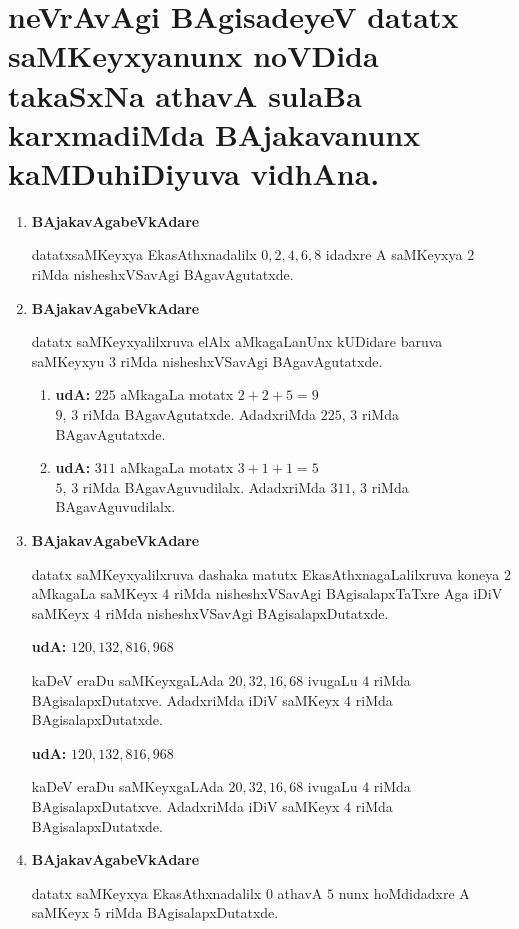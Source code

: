 \chapter{neVrAvAgi BAgisadeyeV datatx saMKeyxyanunx noVDida takaSxNa athavA sulaBa karxmadiMda BAjakavanunx kaMDuhiDiyuva vidhAna.}

\begin{enumerate}[{\rm 1)}]
\item {} \textbf{BAjakavAgabeVkAdare}

datatxsaMKeyxya EkasAthxnadalilx $0,2,4,6,8$ idadxre A saMKeyxya $2$ riMda \-nisheshxVSavAgi BAgavAgutatxde.

\item {} \textbf{BAjakavAgabeVkAdare}

datatx saMKeyxyalilxruva elAlx aMkagaLanUnx kUDidare baruva saMKeyxyu $3$ riMda nisheshxVSavAgi BAgavAgutatxde.
\begin{enumerate}[{\rm 1)}]
\item \textbf{udA:} \qquad $225$ aMkagaLa motatx $2+2+5 =9$\\
\qquad $9$, $3$ riMda BAgavAgutatxde. AdadxriMda $225$, $3$ riMda BAgavAgutatxde.
\item \textbf{udA:} \qquad $311$ aMkagaLa motatx $3+1+1 =5$\\
\qquad $5$, $3$ riMda BAgavAguvudilalx. AdadxriMda $311$, $3$ riMda BAgavAguvudilalx.
\end{enumerate}

\item {} \textbf{BAjakavAgabeVkAdare}

datatx saMKeyxyalilxruva dashaka matutx EkasAthxnagaLalilxruva koneya $2$ aMkagaLa saMKeyx $4$ riMda nisheshxVSavAgi BAgisalapxTaTxre Aga iDiV saMKeyx $4$ riMda nisheshxVSavAgi BAgi\-salapxDutatxde.

\quad \textbf{udA:} $120,132,816,968$ 

kaDeV eraDu saMKeyxgaLAda $20,32,16,68$ ivugaLu $4$ riMda BAgisalapxDutatxve. AdadxriMda iDiV saMKeyx $4$ riMda BAgisalapxDutatxde.

\quad \textbf{udA:} $120,132,816,968$ 

kaDeV eraDu saMKeyxgaLAda $20,32,16,68$ ivugaLu $4$ riMda BAgisalapxDutatxve. AdadxriMda iDiV saMKeyx $4$ riMda BAgisalapxDutatxde.
\item  {} \textbf{BAjakavAgabeVkAdare}

datatx saMKeyxya EkasAthxnadalilx $0$ athavA $5$ nunx hoMdidadxre A saMKeyx $5$ riMda BAgi\-salapxDutatxde.


\end{enumerate}
